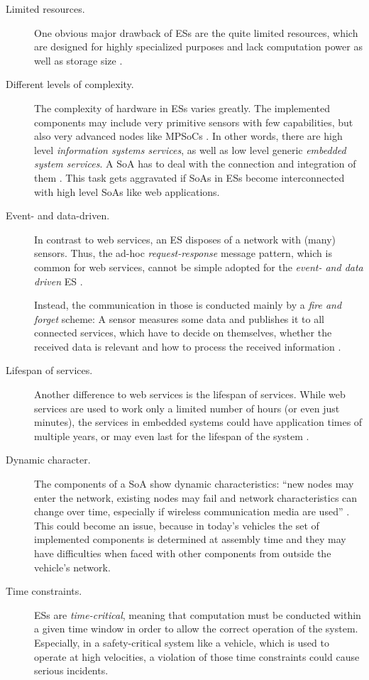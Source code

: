 \begin{description}
\item [Limited resources.]
One obvious major drawback of ESs are the quite limited resources, which are designed for highly specialized purposes and lack computation power as well as storage size \cite{rodrigues2011} \cite{scholz} \cite{sommer}.

\item [Different levels of complexity.]
The complexity of hardware in ESs varies greatly. The implemented components may include very primitive sensors with few capabilities, but also very advanced nodes like MPSoCs \cite{scholz} \cite{sommer}. In other words, there are high level \emph{information systems services}, as well as low level generic \emph{embedded system services}. A SoA has to deal with the connection and integration of them \cite{rodrigues2011}. This task gets aggravated if SoAs in ESs become interconnected with high level SoAs like web applications.

\item [Event- and data-driven.]
In contrast to web services, an ES disposes of a network with (many) sensors. Thus, the ad-hoc \emph{request-response} message pattern, which is common for web services, cannot be simple adopted for the \emph{event- and data driven} ES \cite{sommer}.

Instead, the communication in those is conducted mainly by a \emph{fire and forget} scheme: A sensor measures some data and publishes it to all connected services, which have to decide on themselves, whether the received data is relevant and how to process the received information \cite{sommer}.

\item [Lifespan of services.]
Another difference to web services is the lifespan of services. While web services are used to work only a limited number of hours (or even just minutes), the services in embedded systems could have application times of multiple years, or may even last for the lifespan of the system \cite{buckl}.

\item [Dynamic character.] 
The components of a SoA show dynamic characteristics: ``new nodes may enter the network, existing nodes may fail and network characteristics can change over time, especially if wireless communication media are used'' \cite{sommer}. This could become an issue, because in today's vehicles the set of implemented components is determined at assembly time and they may have difficulties when faced with other components from outside the vehicle's network.

\item [Time constraints.]
ESs are \emph{time-critical}, meaning that computation must be conducted within a given time window in order to allow the correct operation of the system. Especially, in a safety-critical system like a vehicle, which is used to operate at high velocities, a violation of those time constraints could cause serious incidents.
\end{description}


